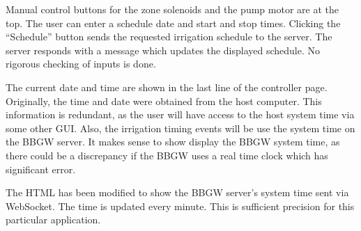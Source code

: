 Manual control buttons for the zone solenoids and the pump motor are at the 
top.  The user can enter a schedule date and start and stop times.  Clicking 
the ``Schedule'' button sends the requested irrigation schedule to the server.  
The server responds with a message which updates the displayed schedule.  No 
rigorous checking of inputs is done.

The current date and time are shown in the last line of the controller page.
Originally, the time and date were obtained from the host computer.  This
information is redundant, as the user will have access to the host system time
via some other GUI.  Also, the irrigation timing events will be use the system
time on the BBGW server.  It makes sense to show display the BBGW system time, as
there could be a discrepancy if the BBGW uses a real time clock which has significant
error.

The HTML has been modified to show the BBGW server's system time sent via WebSocket.
The time is updated every minute.  This is sufficient precision for this
particular application.
